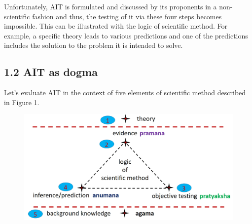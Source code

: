 Unfortunately, AIT is formulated and discussed by its proponents in a non-scientific fashion and thus, the testing of it via these four steps becomes impossible. This can be illustrated with the logic of scientific method. For example, a specific theory leads to various predictions and one of the predictions includes the solution to the problem it is intended to solve.


\subsection*{1.2 AIT as dogma}

Let’s evaluate AIT in the context of five elements of scientific method described in Figure 1.

\begin{figure}[!htbp]
\includegraphics[scale=0.2]{images/8-01.jpg}
\caption{}\label{art8-fig01}
\end{figure}

